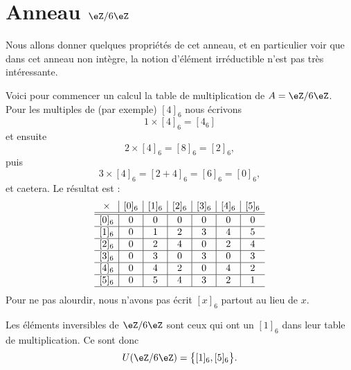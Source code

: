 \section{Anneau \texorpdfstring{$ \eZ/6\eZ$}{Z/6Z}}
\label{SECooSWGKooEeOZTO}

Nous allons donner quelques propriétés de cet anneau, et en particulier voir que dans cet anneau non intègre, la notion d'élément irréductible n'est pas très intéressante.

Voici pour commencer un calcul la table de multiplication de \( A=\eZ/6\eZ\). Pour les multiples de (par exemple) \( [4]_6\) nous écrivons
\begin{equation}
    1\times [4]_6=[4_6]
\end{equation}
et ensuite
\begin{equation}
    2\times [4]_6=[8]_6=[2]_6,
\end{equation}
puis
\begin{equation}
    3\times [4]_6=[2+4]_6=[6]_6=[0]_6,
\end{equation}
et caetera. Le résultat est :
\begin{equation}
\begin{array}{c|c|c|c|c|c|c}
    \times & [0]_6 & [1]_6  & [2]_6  & [3]_6 & [4]_6 & [5]_6  \\
\hline\hline
[0]_6 & 0 & 0 & 0 & 0 & 0 & 0 \\ 
\hline
[1]_6  & 0 & 1 & 2 & 3 & 4 & 5 \\ 
\hline
[2]_6 & 0 & 2 & 4 & 0 & 2 & 4 \\ 
\hline
[3]_6 & 0 & 3 & 0 & 3 & 0 & 3 \\ 
\hline
[4]_6 & 0 & 4 & 2 & 0 & 4 & 2 \\ 
\hline
[5]_6 & 0 & 5 & 4 & 3 & 2 & 1 \\ 
\hline
\end{array}
\end{equation}
Pour ne pas alourdir, nous n'avons pas écrit \( [x]_6\) partout au lieu de \( x\).

\begin{normaltext}[Inversibles]
    Les éléments inversibles de \( \eZ/6\eZ\) sont ceux qui ont un \( [1]_6\) dans leur table de multiplication. Ce sont donc
    \begin{equation}
        U(\eZ/6\eZ)=\big\{ [1]_6,[5]_6 \big\}.
    \end{equation}
\end{normaltext}

